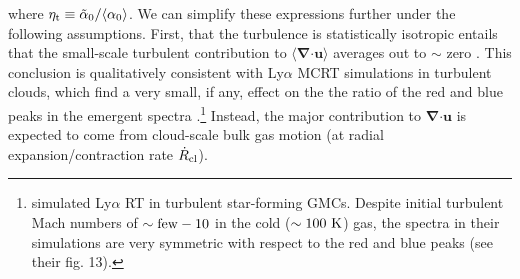 \documentclass[fleqn,usenatbib]{mnras}
\begin{document}
where $\eta_{\rm t} \equiv \Tilde{\alpha}_0/\langle \alpha_0 \rangle$. We can simplify these expressions further under the following assumptions. First, that the turbulence is statistically isotropic entails that the small-scale turbulent contribution to $\langle \boldsymbol{\nabla} \boldsymbol{\cdot} \boldsymbol{u} \rangle$ averages out to $\sim$ zero \citep{Pan2018}. This conclusion is qualitatively consistent with Ly$\alpha$ MCRT simulations in turbulent clouds, which find a very small, if any, effect on the the ratio of the red and blue peaks in the emergent spectra \citep[][]{Kimm2019, Kakiichi2021}.\footnote{\cite{Kimm2019} simulated Ly$\alpha$ RT in turbulent star-forming GMCs. Despite initial turbulent Mach numbers of $\sim \rm few-10$ in the cold ($\sim 100 ~ \rm K$) gas, the spectra in their simulations are very symmetric with respect to the red and blue peaks (see their fig. 13). } Instead, the major contribution to $\boldsymbol{\nabla} \boldsymbol{\cdot} \boldsymbol{u}$ is expected to come from cloud-scale bulk gas motion (at radial expansion/contraction rate $\Dot{R}_{\rm cl}$).  
\end{document}
